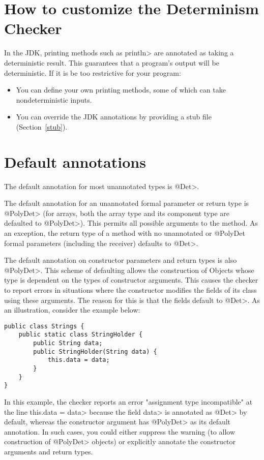 \section{How to customize the Determinism Checker\label{determinism-customization}}

In the JDK, printing methods such as \<println> are annotated as taking a
deterministic result.  This guarantees that a program's output will be
deterministic.  If it is be too restrictive for your program:
\begin{itemize}
\item
  You can define your own printing methods, some of which can take
  nondeterministic inputs.
\item
  You can override the JDK annotations by providing a stub file
  (Section~\ref{stub}).
\end{itemize}


\section{Default annotations\label{determinism-defaults}}

The default annotation for most unannotated types is \<@Det>.

The default annotation for an unannotated formal parameter or return type
is \<@PolyDet> (for arrays, both the array type and its component type
are defaulted to \<@PolyDet>).
This permits all possible arguments to the method.
As an exception, the return type of a method with no unannotated or
@PolyDet formal parameters (including the receiver)
defaults to \<@Det>.

The default annotation on constructor parameters and return types is also \<@PolyDet>.
This scheme of defaulting allows the construction of Objects whose type
is dependent on the types of constructor arguments. This causes the checker
to report errors in situations where the constructor modifies the fields of its class
using these arguments. The reason for this is that the fields default to \<@Det>.
As an illustration, consider the example below:

\begin{Verbatim}
public class Strings {
    public static class StringHolder {
        public String data;
        public StringHolder(String data) {
            this.data = data;
        }
    }
}
\end{Verbatim}

In this example, the checker reports an error "assignment type incompatible"
at the line \<this.data = data> because the field \<data> is annotated as
\<@Det> by default, whereas the constructor argument has \<@PolyDet>
as its default annotation. In such cases, you could either suppress the warning
(to allow construction of \<@PolyDet> objects) or explicitly annotate the
constructor arguments and return types.

